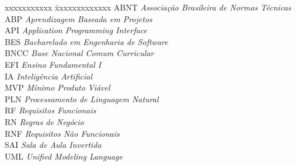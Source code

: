 \ifx\isenglish\undefined
{}
\else
{}
\fi


\begin{tabbing}
xxxxxxxxxxx \= xxxxxxxxxxxxx \kill
\textsc{ABNT}           \> \textit{Associação Brasileira de Normas Técnicas}\\
\textsc{ABP}            \> \textit{Aprendizagem Baseada em Projetos}\\
\textsc{API}            \> \textit{Application Programming Interface}\\
\textsc{BES}            \> \textit{Bacharelado em Engenharia de Software}\\
\textsc{BNCC}           \> \textit{Base Nacional Comum Curricular}\\
\textsc{EFI}            \> \textit{Ensino Fundamental I}\\
\textsc{IA}             \> \textit{Inteligência Artificial}\\
\textsc{MVP}            \> \textit{Mínimo Produto Viável}\\
\textsc{PLN}            \> \textit{Processamento de Linguagem Natural}\\
\textsc{RF}             \> \textit{Requisitos Funcionais}\\
\textsc{RN}             \> \textit{Regras de Negócio}\\
\textsc{RNF}            \> \textit{Requisitos Não Funcionais}\\
\textsc{SAI}            \> \textit{Sala de Aula Invertida}\\
\textsc{UML}            \> \textit{Unified Modeling Language}\\
\end{tabbing}

